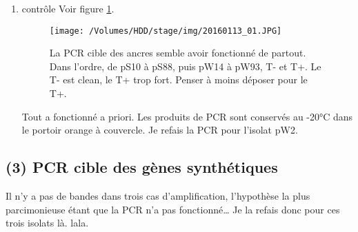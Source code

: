 \documentclass[9pt, oneside, twocolumn]{scrartcl}
\begin{document}
\begin{enumerate}
\item contrôle
\label{sec:orgheadline22}
Voir figure \ref{fig:orgparagraph2}. 

\begin{figure}[htb]
\centering
\texttt{[image: /Volumes/HDD/stage/img/20160113\_01.JPG]}
\caption{\label{fig:orgparagraph2}
La PCR cible des ancres semble avoir fonctionné de partout. Dans l'ordre, de pS10 à pS88, puis pW14 à pW93, T- et T+. Le T- est clean, le T+ trop fort. Penser à moins déposer pour le T+.}
\end{figure}

Tout a fonctionné a priori. Les produits de PCR sont conservés au -20°C dans le
portoir orange à couvercle. Je refais la PCR pour l'isolat pW2.
\end{enumerate}

\subsection{(3) PCR cible des gènes synthétiques}
\label{sec:orgheadline28}
Il n'y a pas de bandes dans trois cas d'amplification, l'hypothèse la plus
parcimonieuse étant que la PCR n'a pas fonctionné… Je la refais donc pour ces
trois isolats là. lala. 
\end{document}
